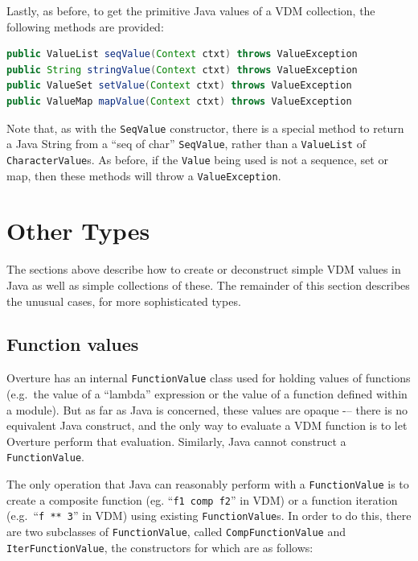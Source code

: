 \documentclass{overturerepchap}
\newcommand{\kw}[1]{{\textbf\ttfamily #1}}
\begin{document}
Lastly, as before, to get the primitive Java values of a VDM collection, the following methods are provided:

\begin{lstlisting}[language=JAVA]
public ValueList seqValue(Context ctxt) throws ValueException
public String stringValue(Context ctxt) throws ValueException
public ValueSet setValue(Context ctxt) throws ValueException
public ValueMap mapValue(Context ctxt) throws ValueException
\end{lstlisting}

Note that, as with the \texttt{SeqValue} constructor, there is a special method to return a Java String from a ``\kw{seq of char}'' \texttt{SeqValue}, rather than a \texttt{ValueList} of \texttt{CharacterValue}s. As before, if the \texttt{Value} being used is not a sequence, set or map, then these methods will throw a \texttt{ValueException}.

\section{Other Types}

The sections above describe how to create or deconstruct simple VDM values in Java as well as simple collections of these. The remainder of this section describes the unusual cases, for more sophisticated types.

\subsection{Function values}

Overture has an internal \texttt{FunctionValue} class used for holding values of functions (e.g.\ the value of a ``{\textbf\ttfamily lambda}'' expression or the value of a function defined within a module). But as far as Java is concerned, these values are opaque -– there is no equivalent Java construct, and the only way to evaluate a VDM function is to let Overture perform that evaluation. Similarly, Java cannot construct a \texttt{FunctionValue}.

The only operation that Java can reasonably perform with a \texttt{FunctionValue} is to create a composite function (eg. ``\texttt{f1 comp f2}'' in VDM) or a function iteration (e.g.\ ``\texttt{f ** 3}'' in VDM) using existing \texttt{FunctionValue}s. In order to do this, there are two subclasses of \texttt{FunctionValue}, called \texttt{CompFunctionValue} and \texttt{IterFunctionValue}, the constructors for which are as follows:
\end{document}
